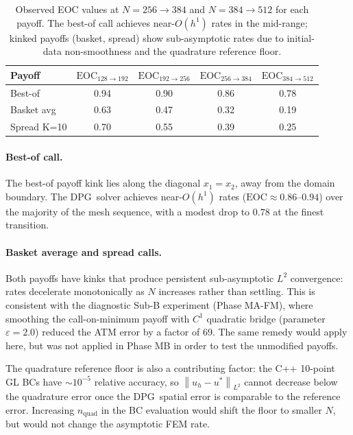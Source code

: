 \documentclass[11pt,a4paper]{article}
\newcommand{\dpg}{\textsc{DPG}}
\newcommand{\norm}[1]{\left\|#1\right\|}
\newcommand{\eoc}{\mathrm{EOC}}
\begin{document}
\begin{table}[htbp]
\centering
\caption{Observed EOC values at $N=256\to384$ and $N=384\to512$ for each payoff.
The best-of call achieves near-$O(h^1)$ rates in the mid-range; kinked payoffs
(basket, spread) show sub-asymptotic rates due to initial-data non-smoothness
and the quadrature reference floor.}
\label{tab:eoc_summary}
\begin{tabular}{@{}lcccc@{}}
\toprule
Payoff & $\eoc_{128\to192}$ & $\eoc_{192\to256}$ & $\eoc_{256\to384}$ & $\eoc_{384\to512}$ \\
\midrule
Best-of   & 0.94 & 0.90 & 0.86 & 0.78 \\
Basket avg & 0.63 & 0.47 & 0.32 & 0.19 \\
Spread K=10 & 0.70 & 0.55 & 0.39 & 0.25 \\
\bottomrule
\end{tabular}
\end{table}

\paragraph{Best-of call.}
The best-of payoff kink lies along the diagonal $x_1=x_2$, away from the
domain boundary.  The \dpg\ solver achieves near-$O(h^1)$ rates ($\eoc \approx 0.86$--$0.94$)
over the majority of the mesh sequence, with a modest drop to $0.78$ at the
finest transition.

\paragraph{Basket average and spread calls.}
Both payoffs have kinks that produce persistent sub-asymptotic $L^2$ convergence:
rates decelerate monotonically as $N$ increases rather than settling.  This is
consistent with the diagnostic Sub-B experiment (Phase MA-FM), where smoothing
the call-on-minimum payoff with $C^1$ quadratic bridge (parameter $\varepsilon=2.0$)
reduced the ATM error by a factor of 69.  The same remedy would apply here,
but was not applied in Phase MB in order to test the unmodified payoffs.

The quadrature reference floor is also a contributing factor: the C++ 10-point
GL BCs have $\sim10^{-5}$ relative accuracy, so $\norm{u_h-u^*}_{L^2}$ cannot
decrease below the quadrature error once the \dpg\ spatial error is comparable
to the reference error.  Increasing $n_\text{quad}$ in the BC evaluation would
shift the floor to smaller $N$, but would not change the asymptotic FEM rate.
\end{document}
